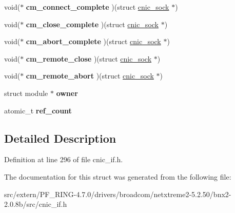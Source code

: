 \begin{DoxyCompactItemize}
\item 
\hypertarget{structcnic__ulp__ops_acad2e30b433d252248c04b62f60e1913}{
void($\ast$ {\bfseries cm\_\-connect\_\-complete} )(struct \hyperlink{structcnic__sock}{cnic\_\-sock} $\ast$)}
\label{structcnic__ulp__ops_acad2e30b433d252248c04b62f60e1913}

\item 
\hypertarget{structcnic__ulp__ops_a8226a400bae765e7546ea71a0e139196}{
void($\ast$ {\bfseries cm\_\-close\_\-complete} )(struct \hyperlink{structcnic__sock}{cnic\_\-sock} $\ast$)}
\label{structcnic__ulp__ops_a8226a400bae765e7546ea71a0e139196}

\item 
\hypertarget{structcnic__ulp__ops_ac384e4d82d00b8fcdb52a6f1642d4a8c}{
void($\ast$ {\bfseries cm\_\-abort\_\-complete} )(struct \hyperlink{structcnic__sock}{cnic\_\-sock} $\ast$)}
\label{structcnic__ulp__ops_ac384e4d82d00b8fcdb52a6f1642d4a8c}

\item 
\hypertarget{structcnic__ulp__ops_ab11b3a735b6cf4af087167cba990c2ea}{
void($\ast$ {\bfseries cm\_\-remote\_\-close} )(struct \hyperlink{structcnic__sock}{cnic\_\-sock} $\ast$)}
\label{structcnic__ulp__ops_ab11b3a735b6cf4af087167cba990c2ea}

\item 
\hypertarget{structcnic__ulp__ops_ac999dcb8bdbe645c35f04e4d881c43f9}{
void($\ast$ {\bfseries cm\_\-remote\_\-abort} )(struct \hyperlink{structcnic__sock}{cnic\_\-sock} $\ast$)}
\label{structcnic__ulp__ops_ac999dcb8bdbe645c35f04e4d881c43f9}

\item 
\hypertarget{structcnic__ulp__ops_ac6e20d3f9d674985d7469cc0735d20e2}{
struct module $\ast$ {\bfseries owner}}
\label{structcnic__ulp__ops_ac6e20d3f9d674985d7469cc0735d20e2}

\item 
\hypertarget{structcnic__ulp__ops_a9c4039ef9249ab111bbf277b0a8da1e0}{
atomic\_\-t {\bfseries ref\_\-count}}
\label{structcnic__ulp__ops_a9c4039ef9249ab111bbf277b0a8da1e0}

\end{DoxyCompactItemize}


\subsection{Detailed Description}


Definition at line 296 of file cnic\_\-if.h.



The documentation for this struct was generated from the following file:\begin{DoxyCompactItemize}
\item 
src/extern/PF\_\-RING-\/4.7.0/drivers/broadcom/netxtreme2-\/5.2.50/bnx2-\/2.0.8b/src/cnic\_\-if.h\end{DoxyCompactItemize}
